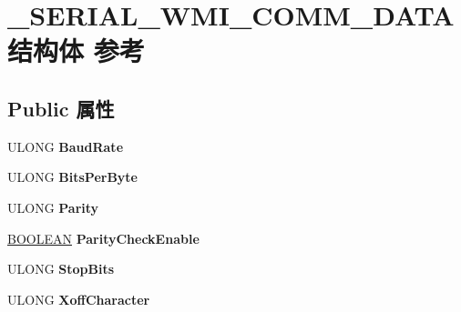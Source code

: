 \hypertarget{struct___s_e_r_i_a_l___w_m_i___c_o_m_m___d_a_t_a}{}\section{\+\_\+\+S\+E\+R\+I\+A\+L\+\_\+\+W\+M\+I\+\_\+\+C\+O\+M\+M\+\_\+\+D\+A\+T\+A结构体 参考}
\label{struct___s_e_r_i_a_l___w_m_i___c_o_m_m___d_a_t_a}
\subsection*{Public 属性}
\begin{DoxyCompactItemize}
\item 
\mbox{\label{struct___s_e_r_i_a_l___w_m_i___c_o_m_m___d_a_t_a_ad5539fc8599fef8be109ddce6c305402}} 
U\+L\+O\+NG {\bfseries Baud\+Rate}
\item 
\mbox{\label{struct___s_e_r_i_a_l___w_m_i___c_o_m_m___d_a_t_a_ad6bdff0d450e0509ef2802688edb268f}} 
U\+L\+O\+NG {\bfseries Bits\+Per\+Byte}
\item 
\mbox{\label{struct___s_e_r_i_a_l___w_m_i___c_o_m_m___d_a_t_a_a6d3ad30fa82ab8903bf853a0c72036c4}} 
U\+L\+O\+NG {\bfseries Parity}
\item 
\mbox{\label{struct___s_e_r_i_a_l___w_m_i___c_o_m_m___d_a_t_a_a5e2a409ed80ade4aa7d4c8cafee8901f}} 
\hyperlink{_processor_bind_8h_a112e3146cb38b6ee95e64d85842e380a}{B\+O\+O\+L\+E\+AN} {\bfseries Parity\+Check\+Enable}
\item 
\mbox{\label{struct___s_e_r_i_a_l___w_m_i___c_o_m_m___d_a_t_a_a9acfc225ecc7a7aeb3afb577fee60077}} 
U\+L\+O\+NG {\bfseries Stop\+Bits}
\item 
\mbox{\label{struct___s_e_r_i_a_l___w_m_i___c_o_m_m___d_a_t_a_a6d9d2d924946be2e6abc3b454a80fb0d}} 
U\+L\+O\+NG {\bfseries Xoff\+Character}
\item 
\mbox{\label{struct___s_e_r_i_a_l___w_m_i___c_o_m_m___d_a_t_a_ae6be6276f2a0556d5c30d10f5d4fa027}} 

\end{DoxyCompactItemize}
